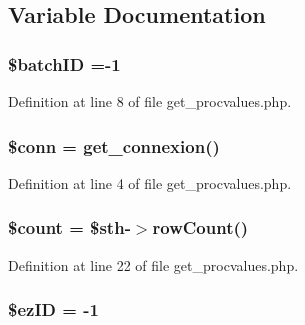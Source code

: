 \subsection{Variable Documentation}
\hypertarget{get__procvalues_8php_aaa6d122ea9cb55b210aadd86e5654a74}{
\subsubsection[{\$batch\-I\-D}]{\setlength{\rightskip}{0pt plus 5cm}\${\bf batch\-I\-D} =-\/1}}\label{get__procvalues_8php_aaa6d122ea9cb55b210aadd86e5654a74}


Definition at line 8 of file get\-\_\-procvalues.\-php.

\hypertarget{get__procvalues_8php_aa8a5a87b9c1a6a0819b88447cbe41877}{
\subsubsection[{\$conn}]{\setlength{\rightskip}{0pt plus 5cm}\$conn = {\bf get\-\_\-connexion}()}}\label{get__procvalues_8php_aa8a5a87b9c1a6a0819b88447cbe41877}


Definition at line 4 of file get\-\_\-procvalues.\-php.

\hypertarget{get__procvalues_8php_af789423037bbc89dc7c850e761177570}{
\subsubsection[{\$count}]{\setlength{\rightskip}{0pt plus 5cm}\$count = \$sth-\/$>$row\-Count()}}\label{get__procvalues_8php_af789423037bbc89dc7c850e761177570}


Definition at line 22 of file get\-\_\-procvalues.\-php.

\hypertarget{get__procvalues_8php_addb1ec3ba55e413a08cb006ce21974df}{
\subsubsection[{\$ez\-I\-D}]{\setlength{\rightskip}{0pt plus 5cm}\${\bf ez\-I\-D} = -\/1}}\label{get__procvalues_8php_addb1ec3ba55e413a08cb006ce21974df}



